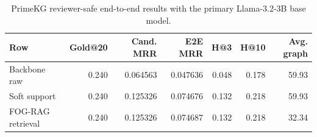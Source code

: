 \begin{table}[t]
\centering
\small
\begin{tabular}{lrrrrrr}
\hline
Row & Gold@20 & Cand. MRR & E2E MRR & H@3 & H@10 & Avg. graph \\
\hline
Backbone raw & 0.240 & 0.064563 & 0.047636 & 0.048 & 0.178 & 59.93 \\
Soft support & 0.240 & 0.125326 & 0.074676 & 0.132 & 0.218 & 59.93 \\
FOG-RAG retrieval & 0.240 & 0.125326 & 0.074687 & 0.132 & 0.218 & 32.34 \\
\hline
\end{tabular}
\caption{PrimeKG reviewer-safe end-to-end results with the primary Llama-3.2-3B base model.}
\label{tab:primekg-e2e}
\end{table}
